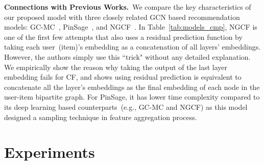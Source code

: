 \documentclass[letterpaper]{article} %
\begin{document}
\begin{footnotesize}
\begin{small}
\begin{table}[htb] \centering
\caption{Comparisons of different graph based recommendation models.}\label{tab:models_cmp}
\end{table}
\end{small}
\end{footnotesize}





\textbf{Connections with Previous Works.}~We compare the key characteristics of our proposed model with three closely related GCN based recommendation models: GC-MC~\cite{kdd2018GCMC}, PinSage~\cite{kdd2018Pinsage}, and NGCF~\cite{sigir2019ngcf}. In Table~\ref{tab:models_cmp}, NGCF is one of the first few attempts that also uses a residual prediction function  by taking each user~(item)'s embedding as a concatenation of all layers' embeddings. However, the authors simply use this ``trick" without any detailed explanation. We empirically show the reason why taking the output of the last layer embedding fails for CF, and shows using residual prediction is equivalent to concatenate all the layer's embeddings as the final embedding of each node in the user-item bipartite graph. For PinSage, it has lower time complexity compared to its deep learning based counterparts~(e.g., GC-MC and NGCF) as this model designed a sampling technique in feature aggregation process.



\section{Experiments}
\end{document}
